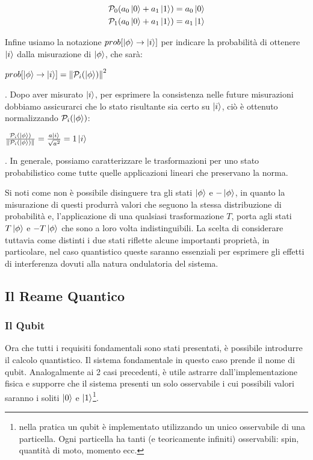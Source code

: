 \documentclass[12pt,a4paper,openright]{report}
\newcommand{\norm}[1]{\left\lVert#1\right\rVert}
\begin{document}
    \begin{center}
        \begin{align*}
            &\mathcal{P}_0(a_0\ket0 + a_1\ket1) = a_0\ket0 \\
            &\mathcal{P}_1(a_0\ket0 + a_1\ket1) = a_1\ket1
        \end{align*}    
    \end{center}
Infine usiamo la notazione $prob[\ket{\phi} \rightarrow \ket{i}]$ per indicare la probabilità di ottenere $\ket{i}$ dalla misurazione di $\ket{\phi}$, 
che sarà:
\begin{center}
    $prob[\ket{\phi} \rightarrow \ket{i}] = \norm{\mathcal{P}_i(\ket{\phi})}^2$
\end{center}
. Dopo aver misurato $\ket{i}$, per esprimere la consistenza nelle future misurazioni dobbiamo assicurarci che lo stato risultante sia certo su $\ket{i}$,
ciò è ottenuto normalizzando $\mathcal{P}_i(\ket{\phi})$:
\begin{center}
    $\frac{\mathcal{P}_i(\ket{\phi})}{\norm{\mathcal{P}_i(\ket{\phi})}}=\frac{a\ket{i}}{\sqrt{a^2}}=1\ket{i}$
\end{center}
. In generale, possiamo caratterizzare le trasformazioni per uno stato probabilistico come tutte quelle applicazioni lineari che preservano la norma.\par
Si noti come non è possibile disinguere tra gli stati $\ket{\phi}$ e $-\ket{\phi}$, in quanto la misurazione di questi produrrà valori che seguono la stessa
distribuzione di probabilità e, l'applicazione di una qualsiasi trasformazione $T$, porta agli stati $T\ket{\phi}$ e $-T\ket{\phi}$ che sono a loro volta
indistinguibili. La scelta di considerare tuttavia come distinti i due stati riflette alcune importanti proprietà, in particolare, nel
caso quantistico queste saranno essenziali per esprimere gli effetti di interferenza dovuti alla natura ondulatoria del sistema.   

\subsection{Il Reame Quantico}
\subsubsection{Il Qubit}
Ora che tutti i requisiti fondamentali sono stati presentati, è possibile introdurre il calcolo quantistico.
Il sistema fondamentale in questo caso prende il nome di qubit. Analogalmente ai 2 casi precedenti, è utile astrarre dall'implementazione fisica
e supporre che il sistema presenti un solo osservabile i cui possibili valori saranno i soliti $\ket0$ e $\ket1$\footnote{nella pratica un qubit è implementato utilizzando un unico osservabile di una particella. Ogni particella ha tanti (e teoricamente infiniti) osservabili: spin, quantità di moto, momento ecc. }.
\end{document}
